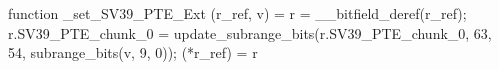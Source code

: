 function _set_SV39_PTE_Ext (r_ref, v) = {
    r = __bitfield_deref(r_ref);
    r.SV39_PTE_chunk_0 = update_subrange_bits(r.SV39_PTE_chunk_0, 63, 54, subrange_bits(v, 9, 0));
    (*r_ref) = r
}
